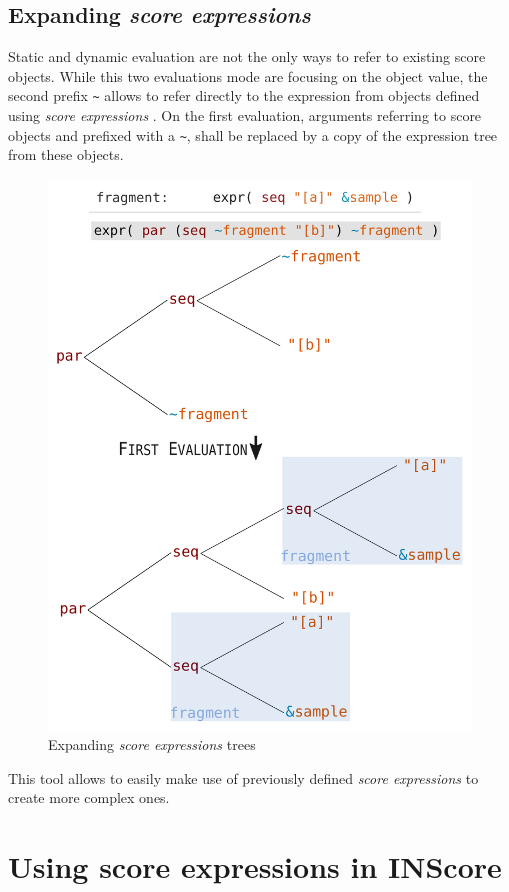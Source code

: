 \documentclass{article}
\newcommand{\OSC}[1]{\texttt{#1}}
\newcommand{\sExpr}{\emph{score expressions} }
\newcommand{\lowTilde} 		{\textasciitilde}
\begin{document}
\subsection{Expanding \sExpr}

Static and dynamic evaluation are not the only ways to refer to existing score objects. While this two evaluations mode are focusing on the object value, the second prefix \OSC{\lowTilde} allows to refer directly to the expression from objects defined using \sExpr. On the first evaluation, arguments referring to score objects and prefixed with a \OSC{\lowTilde}, shall be replaced by a copy of the expression tree from these objects.

\begin{figure}[th]
\centering
\includegraphics[width=0.9\columnwidth]{imgs/expandingTree}
\caption{Expanding \sExpr trees
\label{fig:expandingTree}}
\end{figure}

This tool allows to easily make use of previously defined \sExpr	 to create more complex ones.


\section{Using score expressions in INScore}
\end{document}
